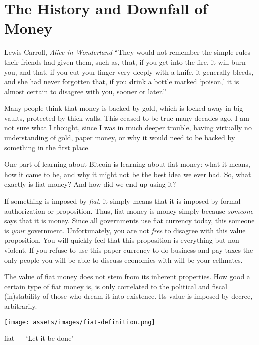 \chapter{The History and Downfall of Money}
\label{les:12}

\begin{chapquote}{Lewis Carroll, \textit{Alice in Wonderland}}
\enquote{They would not remember the simple rules their friends had given them, such
as, that, if you get into the fire, it will burn you, and that, if you cut your
finger very deeply with a knife, it generally bleeds, and she had never
forgotten that, if you drink a bottle marked `poison,' it is almost certain to
disagree with you, sooner or later.}
\end{chapquote}

Many people think that money is backed by gold, which is locked away in
big vaults, protected by thick
walls. This ceased to be true many decades ago. I am not sure what I
thought, since I was in much deeper trouble, having virtually no
understanding of gold, paper money, or why it would need to be backed by
something in the first place.

One part of learning about Bitcoin is learning about fiat money: what it
means, how it came to be, and why it might not be the best idea we ever
had. So, what exactly is fiat money? And how did we end up using it?

If something is imposed by \textit{fiat}, it simply means that it is imposed by
formal authorization or proposition. Thus, fiat money is money simply
because \textit{someone} says that it is money. Since all governments use fiat
currency today, this someone is \textit{your} government. Unfortunately, you
are not \textit{free} to disagree with this value proposition. You will quickly
feel that this proposition is everything but non-violent. If you refuse
to use this paper currency to do business and pay taxes the only people
you will be able to discuss economics with will be your cellmates.

The value of fiat money does not stem from its inherent properties. How
good a certain type of fiat money is, is only correlated to the
political and fiscal (in)stability of those who dream it into existence.
Its value is imposed by decree, arbitrarily.

\begin{center}
  \centering
  \texttt{[image: assets/images/fiat-definition.png]}
  \caption{fiat --- `Let it be done'}
  \label{fig:fiat-definition}
\end{center}

